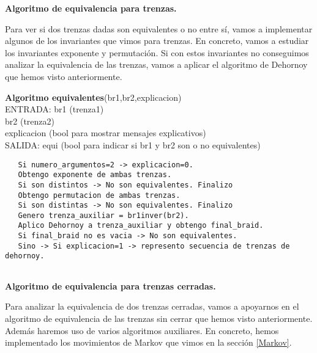 \bigskip
\begin{center}
	\textbf{Algoritmo de equivalencia para trenzas.}
\end{center} 
Para ver si dos trenzas dadas son equivalentes o no entre sí, vamos a implementar algunos de los invariantes que vimos para trenzas. En concreto, vamos a estudiar los invariantes exponente y permutación. Si con estos invariantes no conseguimos analizar la equivalencia de las trenzas, vamos a aplicar el algoritmo de Dehornoy que hemos visto anteriormente. \\

\begin{alg}
	\textbf{Algoritmo equivalentes}(br1,br2,explicacion)\\
	ENTRADA: br1 (trenza1)\\
	\hspace*{2.2cm} br2 (trenza2)\\
	\hspace*{2.2cm} explicacion (bool para mostrar mensajes explicativos)\\
	SALIDA: \hspace{0.4cm} equi (bool para indicar si br1 y br2 son o no equivalentes)
	
\begin{lstlisting}
   Si numero_argumentos=2 -> explicacion=0.
   Obtengo exponente de ambas trenzas.
   Si son distintos -> No son equivalentes. Finalizo
   Obtengo permutacion de ambas trenzas.
   Si son distintas -> No son equivalentes. Finalizo
   Genero trenza_auxiliar = br1inver(br2).
   Aplico Dehornoy a trenza_auxiliar y obtengo final_braid.
   Si final_braid no es vacia -> No son equivalentes. 
   Sino -> Si explicacion=1 -> represento secuencia de trenzas de dehornoy.
    
\end{lstlisting}
\end{alg}

\bigskip
\begin{center}
	\textbf{Algoritmo de equivalencia para trenzas cerradas.}
\end{center} 
Para analizar la equivalencia de dos trenzas cerradas, vamos a apoyarnos en el algoritmo de equivalencia de las trenzas sin cerrar que hemos visto anteriormente. Además haremos uso de varios algoritmos auxiliares. En concreto, hemos implementado los movimientos de Markov que vimos en la sección \ref{Markov}.\\

